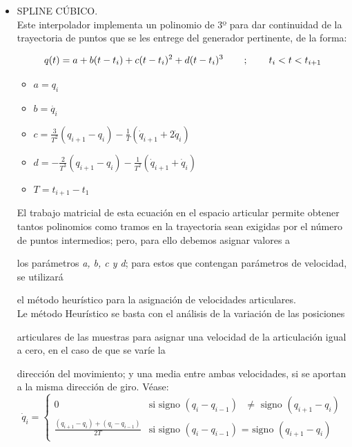 	\begin{itemize}
		\item SPLINE CÚBICO.\\
		Este interpolador implementa un polinomio de 3º para dar continuidad de la trayectoria de puntos que se les entrege del
		generador pertinente, de la forma:
		\begin{center}
			\begin{equation}
				q(t)= a + b (t-t_{i}) +c (t-t_{i})^{2} + d (t-t_{i})^{3} \hspace{0.75cm};\hspace{0.75cm} t_{i}<t<t_{i+1}
			\end{equation}
			\begin{itemize}
				\item $a = q_{i} $
				\item $b = \dot{q_{i}} $
				\item $c= \frac{3}{T^{2}}(q_{i+1}-q_{i})-\frac{1}{T}(\dot{q}_{i+1}+2\dot{q}_{i})$
				\item $d= -\frac{2}{T^{3}}(q_{i+1}-q_{i})-\frac{1}{T^{2}}(\dot{q}_{i+1}+\dot{q}_{i})$
				\item $T=t_{i+1}-t_{1}$
			\end{itemize}
		\end{center}
	El trabajo matricial de esta ecuación en el espacio articular permite obtener tantos
	polinomios como tramos en la trayectoria sean exigidas por el número de puntos intermedios; pero, para ello debemos asignar valores a
	
	los parámetros \textit{a, b, c y d}; para estos que contengan parámetros de velocidad, se utilizará
	
	el método heurístico para la asignación de velocidades articulares.\\
	
	
	
	Le método Heurístico se basta con el análisis de la variación de las posiciones
	
	articulares de las muestras para asignar una velocidad de la articulación igual a cero, en el caso de que se varíe la
	
	dirección del movimiento; y una media entre ambas velocidades, si se aportan a la misma dirección de giro. Véase: \\
	
	
	
	\[	
	\dot{q}_{i}= \left\{ \begin{array}{ll}
	
	0 & \textrm{si signo $(q_{i}-q_{i-1})$ $\neq$ signo $(q_{i+1}- q_{i})$} \\
	
	\frac{(q_{i+1}- q_{i})+(q_{i}-q_{i-1})}{2T} & \textrm{si signo $(q_{i}-q_{i-1})$ = signo $(q_{i+1}- q_{i})$}
	
	
	
	\end{array}\right.
	\]
	
	
	
	
	
\end{itemize}










